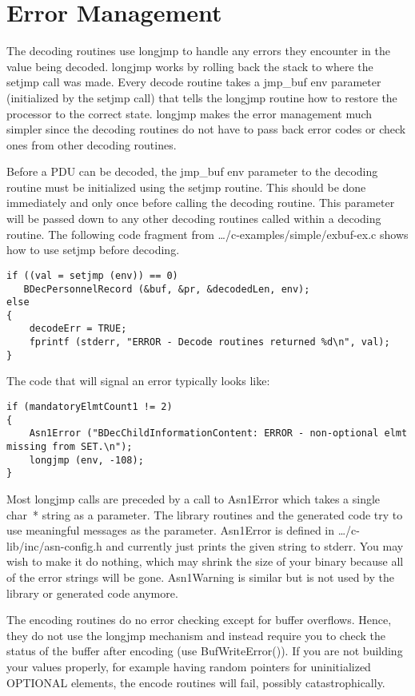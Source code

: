 \section{\label{lib-err-C-section}Error Management}

The decoding routines use {\C longjmp} to handle any errors they
encounter in the value being decoded.  {\C longjmp} works by rolling
back the stack to where the {\C setjmp} call was made.  Every decode
routine takes a {\C jmp\_buf env} parameter (initialized by the
{\C setjmp} call) that tells the {\C longjmp} routine how to
restore the processor to the correct state.  {\C longjmp} makes the
error management much simpler since the decoding routines do not have
to pass back error codes or check ones from other decoding routines.

Before a PDU can be decoded, the {\C jmp\_buf env} parameter to the
decoding routine must be initialized using the {\C setjmp} routine.
This should be done immediately and only once before calling the
decoding routine.  This parameter will be passed down to any other
decoding routines called within a decoding routine. The following code
fragment from {\ufn \dots/c-examples/simple/exbuf-ex.c} shows how to
use {\C setjmp} before decoding.

\begin{small}
\begin{verbatim}
if ((val = setjmp (env)) == 0)
   BDecPersonnelRecord (&buf, &pr, &decodedLen, env);
else
{
    decodeErr = TRUE;
    fprintf (stderr, "ERROR - Decode routines returned %d\n", val);
}
\end{verbatim}
\end{small}

The code that will signal an error typically looks like:
\begin{small}
\begin{verbatim}
if (mandatoryElmtCount1 != 2)
{
    Asn1Error ("BDecChildInformationContent: ERROR - non-optional elmt missing from SET.\n");
    longjmp (env, -108);
}
\end{verbatim}
\end{small}


Most {\C longjmp} calls are preceded by a call to {\C Asn1Error}
which takes a single {\C char~*} string as a parameter.  The library
routines and the generated code try to use meaningful messages as the
parameter. {\C Asn1Error} is defined in {\ufn \dots/c-lib/inc/asn-config.h} and
currently just prints the given string to {\C stderr}.  You may wish
to make it do nothing, which may shrink the size of your binary
because all of the error strings will be gone.  {\C Asn1Warning} is
similar but is not used by the library or generated code anymore.

The encoding routines do no error checking except for buffer
overflows.  Hence, they do not use the {\C longjmp} mechanism and
instead require you to check the status of the buffer after encoding
(use {\C BufWriteError()}).  If you are not building your values
properly, for example having random pointers for uninitialized
OPTIONAL elements, the encode routines will fail, possibly
catastrophically.
